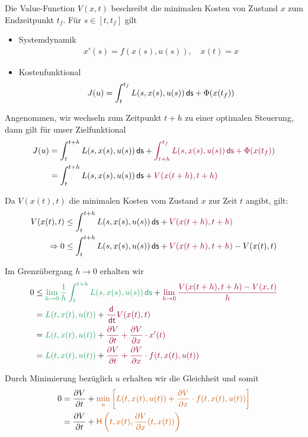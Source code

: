 \documentclass[a4paper, 12pt]{scrartcl}
\newcommand{\gruen}[2][cadGreen]{\textcolor{#1}{#2}}
\newcommand{\orange}[2][orange]{\textcolor{#1}{#2}}
\newcommand{\dunkelrot}[2][dunkelrot]{\textcolor{#1}{#2}}
\newcommand{\dt}{\thinspace \mathsf{dt}}
\newcommand{\ds}{\thinspace \mathsf{ds}}
\begin{document}
\begin{beweis}
    Die Value-Function $V(x,t)$ beschreibt die minimalen Kosten von Zustand $x$ zum Endzeitpunkt $t_f$.  Für $s \in [t,t_f]$ gilt
    \begin{itemize}
        \item Systemdynamik
        \begin{align*}
            x'(s) = f(x(s), u(s)), \quad x(t) = x
        \end{align*}

        \item Kostenfunktional
        \begin{align*}
            J(u) = \int_t^{t_f} L(s,x(s),u(s)) \ds + \Phi(x(t_f))
        \end{align*}
    \end{itemize}

    Angenommen, wir wechseln zum Zeitpunkt $t+h$ zu einer optimalen Steuerung, dann gilt für unser Zielfunktional 
    \begin{align*}
        J(u) 
        &= \int_{t}^{t+h} L(s,x(s),u(s)) \ds + \dunkelrot{\int_{t+h}^{t_f} L(s,x(s),u(s)) \ds + \Phi(x(t_f)) } \\
        &= \int_{t}^{t+h} L(s,x(s),u(s)) \ds + \dunkelrot{V(x(t+h),t+h)} 
    \end{align*}

    Da $V(x(t), t)$ die minimalen Kosten vom Zustand $x$ zur Zeit $t$ angibt, gilt:
    \begin{align*}
        V(x(t),t) 
        &\leq \int_{t}^{t+h} L(s,x(s),u(s)) \ds + \dunkelrot{V(x(t+h),t+h)} \\
        \Rightarrow 0 &\leq \int_{t}^{t+h} L(s,x(s),u(s)) \ds + \dunkelrot{V(x(t+h),t+h)} - V(x(t),t) 
    \end{align*}

    Im Grenzübergang $h \to 0$ erhalten wir
    \begin{align*}
        0 &\leq \gruen{\lim_{h \to 0}  \frac{1}{h}  \int_{t}^{t+h} L(s,x(s),u(s)) \ds} + \dunkelrot{\lim_{h \to 0} \frac{ V(x(t+h),t+h) - V(x,t) }{h}} \\
        &= \gruen{ L(t,x(t),u(t))} + \dunkelrot{\frac{\mathsf{d}}{\dt} V(x(t),t)} \\
        &= \gruen{ L(t,x(t),u(t))} + \dunkelrot{\frac{\partial V}{\partial t}  + \frac{\partial V}{\partial x} \cdot x'(t)} \\
        &= \gruen{ L(t,x(t),u(t))} + \dunkelrot{\frac{\partial V}{\partial t}  + \frac{\partial V}{\partial x} \cdot f(t,x(t), u(t))}
    \end{align*}

    Durch Minimierung bezüglich $u$ erhalten wir die Gleichheit und somit
    \begin{align*}
        0 &= \frac{\partial V}{\partial t} + \orange{\min_{u} \left[L(t,x(t),u(t)) +  \frac{\partial V}{\partial x} \cdot f(t,x(t), u(t))   \right]} \\
        &= \frac{\partial V}{\partial t} + \orange{\textsf{H}\left(t,x(t) , \frac{\partial V}{\partial x}(t,x(t)) \right)}
    \end{align*}
\end{beweis}
\end{document}
